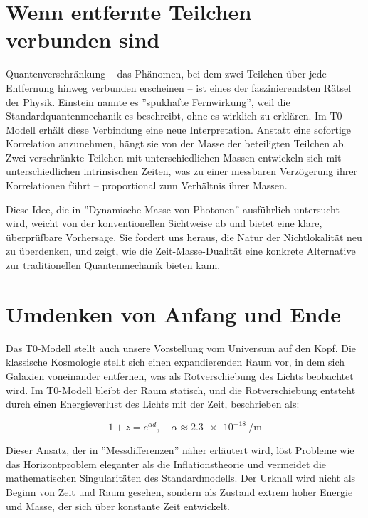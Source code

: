 \documentclass[a4paper,12pt]{article}
\begin{document}
	\section{Wenn entfernte Teilchen verbunden sind}
	
	Quantenverschränkung – das Phänomen, bei dem zwei Teilchen über jede Entfernung hinweg verbunden erscheinen – ist eines der faszinierendsten Rätsel der Physik. Einstein nannte es ''spukhafte Fernwirkung'', weil die Standardquantenmechanik es beschreibt, ohne es wirklich zu erklären. Im T0-Modell erhält diese Verbindung eine neue Interpretation. Anstatt eine sofortige Korrelation anzunehmen, hängt sie von der Masse der beteiligten Teilchen ab. Zwei verschränkte Teilchen mit unterschiedlichen Massen entwickeln sich mit unterschiedlichen intrinsischen Zeiten, was zu einer messbaren Verzögerung ihrer Korrelationen führt – proportional zum Verhältnis ihrer Massen.
	
	Diese Idee, die in ''Dynamische Masse von Photonen'' \cite{pascher_photons_2025} ausführlich untersucht wird, weicht von der konventionellen Sichtweise ab und bietet eine klare, überprüfbare Vorhersage. Sie fordert uns heraus, die Natur der Nichtlokalität neu zu überdenken, und zeigt, wie die Zeit-Masse-Dualität eine konkrete Alternative zur traditionellen Quantenmechanik bieten kann.
	
	\section{Umdenken von Anfang und Ende}
	
	Das T0-Modell stellt auch unsere Vorstellung vom Universum auf den Kopf. Die klassische Kosmologie stellt sich einen expandierenden Raum vor, in dem sich Galaxien voneinander entfernen, was als Rotverschiebung des Lichts beobachtet wird. Im T0-Modell bleibt der Raum statisch, und die Rotverschiebung entsteht durch einen Energieverlust des Lichts mit der Zeit, beschrieben als:
	
	\begin{equation}
		1 + z = e^{\alpha d}, \quad \alpha \approx \SI{2.3e-18}{\per\meter}
	\end{equation}
	
	Dieser Ansatz, der in ''Messdifferenzen'' \cite{pascher_messdifferenzen_2025} näher erläutert wird, löst Probleme wie das Horizontproblem eleganter als die Inflationstheorie und vermeidet die mathematischen Singularitäten des Standardmodells. Der Urknall wird nicht als Beginn von Zeit und Raum gesehen, sondern als Zustand extrem hoher Energie und Masse, der sich über konstante Zeit entwickelt.
	
\end{document}
